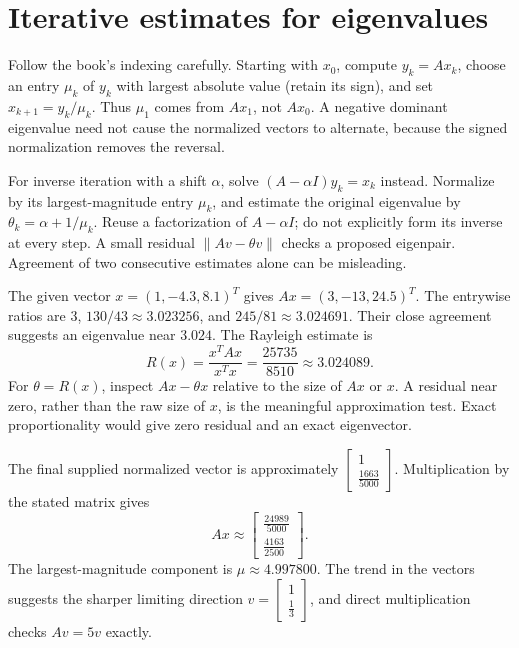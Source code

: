 \section{Iterative estimates for eigenvalues}
Follow the book's indexing carefully. Starting with $x_0$, compute
$y_k=Ax_k$, choose an entry $\mu_k$ of $y_k$ with largest absolute
value (retain its sign), and set $x_{k+1}=y_k/\mu_k$.
Thus $\mu_1$ comes from $Ax_1$, not $Ax_0$. A negative dominant
eigenvalue need not cause the normalized vectors to alternate, because
the signed normalization removes the reversal.

For inverse iteration with a shift $\alpha$, solve
$(A-\alpha I)y_k=x_k$ instead. Normalize by its largest-magnitude
entry $\mu_k$, and estimate the original eigenvalue by
$\theta_k=\alpha+1/\mu_k$. Reuse a factorization of $A-\alpha I$;
do not explicitly form its inverse at every step.
A small residual $\|Av-\theta v\|$ checks a proposed eigenpair.
Agreement of two consecutive estimates alone can be misleading.

The given vector $x=(1,-4.3,8.1)^T$ gives $Ax=(3,-13,24.5)^T$.
The entrywise ratios are $3$, $130/43\approx3.023256$, and
$245/81\approx3.024691$. Their close agreement suggests an eigenvalue
near $3.024$. The Rayleigh estimate is
\[R(x)=\frac{x^TAx}{x^Tx}=\frac{25735}{8510}
\approx3.024089.\]
For $\theta=R(x)$, inspect $Ax-\theta x$ relative to the size of
$Ax$ or $x$. A residual near zero, rather than the raw size of $x$,
is the meaningful approximation test. Exact proportionality would give
zero residual and an exact eigenvector.

The final supplied normalized vector is approximately $\left[\begin{matrix}1\\\frac{1663}{5000}\end{matrix}\right]$.
Multiplication by the stated matrix gives
\[Ax\approx\left[\begin{matrix}\frac{24989}{5000}\\\frac{4163}{2500}\end{matrix}\right].\]
The largest-magnitude component is $\mu\approx4.997800$.
The trend in the vectors suggests the sharper limiting direction
$v=\left[\begin{matrix}1\\\frac{1}{3}\end{matrix}\right]$, and direct multiplication checks
$Av=5v$ exactly.

